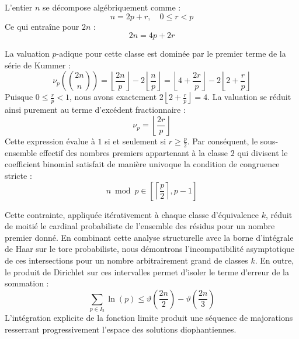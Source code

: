 \documentclass[12pt,a4paper]{article}
\begin{document}
    L'entier $n$ se décompose algébriquement comme :
    \begin{equation}
    n = 2 p + r, \quad 0 \le r < p
    \end{equation}
    Ce qui entraîne pour $2n$ :
    \begin{equation}
    2n = 4 p + 2r
    \end{equation}

    La valuation $p$-adique pour cette classe est dominée par le premier terme de la série de Kummer :
    \begin{equation}
    \nu_p\left( \binom{2n}{n} \right) = \left\lfloor \frac{2n}{p} \right\rfloor - 2 \left\lfloor \frac{n}{p} \right\rfloor = \left\lfloor 4 + \frac{2r}{p} \right\rfloor - 2 \left\lfloor 2 + \frac{r}{p} \right\rfloor
    \end{equation}
    Puisque $0 \le \frac{r}{p} < 1$, nous avons exactement $2 \left\lfloor 2 + \frac{r}{p} \right\rfloor = 4$.
    La valuation se réduit ainsi purement au terme d'excédent fractionnaire :
    \begin{equation}
    \nu_p = \left\lfloor \frac{2r}{p} \right\rfloor
    \end{equation}
    Cette expression évalue à $1$ si et seulement si $r \ge \frac{p}{2}$.
    Par conséquent, le sous-ensemble effectif des nombres premiers appartenant à la classe $2$ qui divisent le coefficient binomial satisfait de manière univoque la condition de congruence stricte :
    \begin{equation}
    n \bmod p \in \left[ \left\lceil \frac{p}{2} \right\rceil, p - 1 \right]
    \end{equation}

    Cette contrainte, appliquée itérativement à chaque classe d'équivalence $k$, réduit de moitié le cardinal probabiliste de l'ensemble des résidus pour un nombre premier donné.
    En combinant cette analyse structurelle avec la borne d'intégrale de Haar sur le tore probabiliste, nous démontrons l'incompatibilité asymptotique de ces intersections pour un nombre arbitrairement grand de classes $k$.
    En outre, le produit de Dirichlet sur ces intervalles permet d'isoler le terme d'erreur de la sommation :
    \begin{equation}
    \sum_{p \in I_2} \ln(p) \le \vartheta\left(\frac{2n}{2}\right) - \vartheta\left(\frac{2n}{3}\right)
    \end{equation}
    L'intégration explicite de la fonction limite produit une séquence de majorations resserrant progressivement l'espace des solutions diophantiennes.
    
\end{document}

